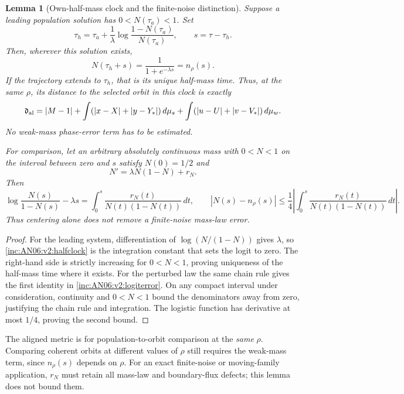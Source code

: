 \documentclass[11pt]{article}
\numberwithin{equation}{section}
\newtheorem{lemma}[theorem]{Lemma}
\theoremstyle{remark}\newtheorem{remark}[theorem]{Remark}
\newcommand{\1}{\mathbf 1}
\begin{document}
\begin{lemma}[Own-half-mass clock and the finite-noise distinction]
\label{inc:AN06:v2:clockalignment}
Suppose a leading population solution has $0<N(\tau_a)<1$. Set
\begin{equation}\label{inc:AN06:v2:halfclock}
 \tau_h=\tau_a+\frac1\lambda\log\frac{1-N(\tau_a)}{N(\tau_a)},
 \qquad s=\tau-\tau_h.
\end{equation}
Then, wherever this solution exists,
\[
 N(\tau_h+s)=\frac1{1+e^{-\lambda s}}=n_\rho(s).
\]
If the trajectory extends to $\tau_h$, that is its unique half-mass time.
Thus, at the same $\rho$, its distance to the selected orbit in this clock
is exactly
\begin{equation}\label{inc:AN06:v2:aligneddistance}
 \mathfrak d_{\rm al}=|M-1|
 +\int(|x-X|+|y-Y_*|)\,d\mu_s
 +\int(|u-U|+|v-V_*|)\,d\mu_w.
\end{equation}
No weak-mass phase-error term has to be estimated.

For comparison, let an arbitrary absolutely continuous mass with
$0<N<1$ on the interval between zero and $s$ satisfy $N(0)=1/2$ and
\[
 N'=\lambda N(1-N)+r_N.
\]
Then
\begin{equation}\label{inc:AN06:v2:logiterror}
 \log\frac{N(s)}{1-N(s)}-\lambda s
 =\int_0^s\frac{r_N(t)}{N(t)(1-N(t))}\,dt,
 \qquad
 |N(s)-n_\rho(s)|
 \le\frac14\left|\int_0^s\frac{r_N(t)}{N(t)(1-N(t))}\,dt\right|.
\end{equation}
Thus centering alone does not remove a finite-noise mass-law error.
\end{lemma}
\begin{proof}
For the leading system, differentiation of $\log(N/(1-N))$ gives
$\lambda$, so \eqref{inc:AN06:v2:halfclock} is the integration constant
that sets the logit to zero. The right-hand side is strictly increasing
for $0<N<1$, proving uniqueness of the half-mass time where it exists.
For the perturbed law the same chain rule gives the first identity in
\eqref{inc:AN06:v2:logiterror}. On any compact interval under consideration,
continuity and $0<N<1$ bound the denominators away from zero, justifying
the chain rule and integration. The logistic function has derivative
at most $1/4$, proving the second bound.
\end{proof}

The aligned metric is for population-to-orbit comparison at the
\emph{same} $\rho$. Comparing coherent orbits at different values of $\rho$
still requires the weak-mass term, since $n_\rho(s)$ depends on $\rho$.
For an exact finite-noise or moving-family application, $r_N$ must retain
all mass-law and boundary-flux defects; this lemma does not bound them.
\end{document}
